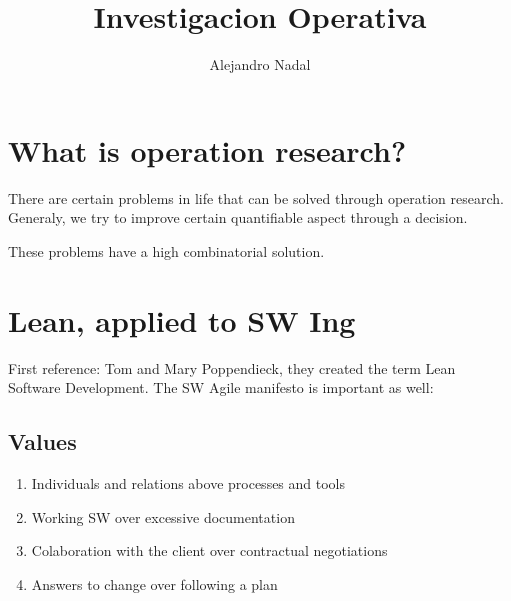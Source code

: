 \documentclass[a4paper,12pt]{article}
\begin{document}
\title{Investigacion Operativa}
\author{Alejandro Nadal}
\maketitle

\section{What is operation research?}

There are certain problems in life that can be solved through operation research. Generaly, we try to improve certain quantifiable aspect through a decision.

These problems have a high combinatorial solution.

\section{Lean, applied to SW Ing}

First reference: Tom and Mary Poppendieck, they created the term Lean Software Development. The SW Agile manifesto is important as well:

\subsection{Values}
\begin{enumerate}
\item Individuals and relations above processes and tools
\item Working SW over excessive documentation
\item Colaboration with the client over contractual negotiations
\item Answers to change over following a plan
\end{enumerate}
\end{document}
